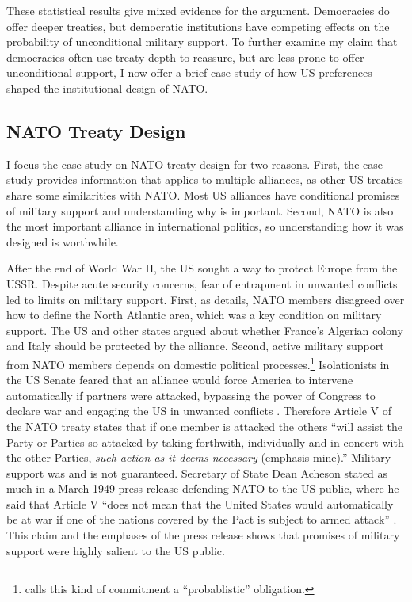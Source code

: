 \documentclass[12pt]{article}
\begin{document}
These statistical results give mixed evidence for the argument. 
Democracies do offer deeper treaties, but democratic institutions have competing effects on the probability of unconditional military support. 
To further examine my claim that democracies often use treaty depth to reassure, but are less prone to offer unconditional support, I now offer a brief case study of how US preferences shaped the institutional design of NATO. 


\subsection{NATO Treaty Design}


I focus the case study on NATO treaty design for two reasons. 
First, the case study provides information that applies to multiple alliances, as other US treaties share some similarities with NATO. 
Most US alliances have conditional promises of military support and understanding why is important.
Second, NATO is also the most important alliance in international politics, so understanding how it was designed is worthwhile. 


After the end of World War II, the US sought a way to protect Europe from the USSR. 
Despite acute security concerns, fear of entrapment in unwanted conflicts led to limits on military support. 
First, as \citet{Poast2019a} details, NATO members disagreed over how to define the North Atlantic area, which was a key condition on military support. 
The US and other states argued about whether France's Algerian colony and Italy should be protected by the alliance. 
Second, active military support from NATO members depends on domestic political processes.\footnote{\citet{Benson2012} calls this kind of commitment a ``probablistic'' obligation.} 
Isolationists in the US Senate feared that an alliance would force America to intervene automatically if partners were attacked, bypassing the power of Congress to declare war and engaging the US in unwanted conflicts \citep[pg. 280-1]{Acheson1969}.
Therefore Article V of the NATO treaty states that if one member is attacked the others ``will assist the Party or Parties so attacked by taking forthwith, individually and in concert with the other Parties, \emph{such action as it deems necessary} (emphasis mine).'' 
Military support was and is not guaranteed. 
Secretary of State Dean Acheson stated as much in a March 1949 press release defending NATO to the US public, where he said that Article V ``does not mean that the United States would automatically be at war if one of the nations covered by the Pact is subject to armed attack'' \citep{Acheson1949}.
This claim and the emphases of the press release shows that promises of military support were highly salient to the US public.
\end{document}
